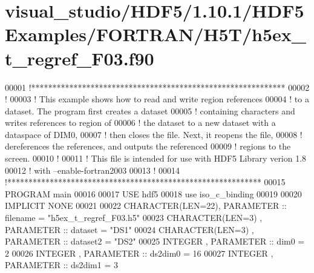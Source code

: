 \hypertarget{visual__studio_2_h_d_f5_21_810_81_2_h_d_f5_examples_2_f_o_r_t_r_a_n_2_h5_t_2h5ex__t__regref___f03_8f90_source}{}\section{visual\+\_\+studio/\+H\+D\+F5/1.10.1/\+H\+D\+F5\+Examples/\+F\+O\+R\+T\+R\+A\+N/\+H5\+T/h5ex\+\_\+t\+\_\+regref\+\_\+\+F03.f90}
\label{visual__studio_2_h_d_f5_21_810_81_2_h_d_f5_examples_2_f_o_r_t_r_a_n_2_h5_t_2h5ex__t__regref___f03_8f90_source}

\begin{DoxyCode}
00001 \textcolor{comment}{!************************************************************}
00002 \textcolor{comment}{!}
00003 \textcolor{comment}{!  This example shows how to read and write region references}
00004 \textcolor{comment}{!  to a dataset.  The program first creates a dataset}
00005 \textcolor{comment}{!  containing characters and writes references to region of}
00006 \textcolor{comment}{!  the dataset to a new dataset with a dataspace of DIM0,}
00007 \textcolor{comment}{!  then closes the file.  Next, it reopens the file,}
00008 \textcolor{comment}{!  dereferences the references, and outputs the referenced}
00009 \textcolor{comment}{!  regions to the screen.}
00010 \textcolor{comment}{!}
00011 \textcolor{comment}{!  This file is intended for use with HDF5 Library verion 1.8}
00012 \textcolor{comment}{!  with --enable-fortran2003 }
00013 \textcolor{comment}{!}
00014 \textcolor{comment}{!************************************************************}
00015 \textcolor{keyword}{PROGRAM} main
00016 
00017   \textcolor{keywordtype}{USE }hdf5
00018   \textcolor{keywordtype}{use }iso\_c\_binding
00019 
00020   \textcolor{keywordtype}{IMPLICIT NONE}
00021 
00022   \textcolor{keywordtype}{CHARACTER(LEN=22)}, \textcolor{keywordtype}{PARAMETER} :: filename  = \textcolor{stringliteral}{"h5ex\_t\_regref\_F03.h5"}
00023   \textcolor{keywordtype}{CHARACTER(LEN=3)} , \textcolor{keywordtype}{PARAMETER} :: dataset   = \textcolor{stringliteral}{"DS1"}
00024   \textcolor{keywordtype}{CHARACTER(LEN=3)} , \textcolor{keywordtype}{PARAMETER} :: dataset2  = \textcolor{stringliteral}{"DS2"}
00025   \textcolor{keywordtype}{INTEGER}          , \textcolor{keywordtype}{PARAMETER} :: dim0      = 2
00026   \textcolor{keywordtype}{INTEGER}          , \textcolor{keywordtype}{PARAMETER} :: ds2dim0   = 16
00027   \textcolor{keywordtype}{INTEGER}          , \textcolor{keywordtype}{PARAMETER} :: ds2dim1   = 3

\end{DoxyCode}

